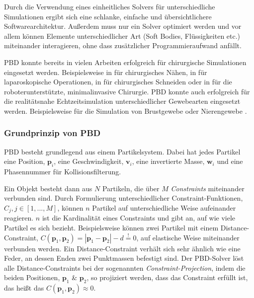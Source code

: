 Durch die Verwendung eines einheitliches Solvers für unterschiedliche Simulationen ergibt sich eine schlanke, einfache und übersichtlichere Softwarearchitektur. Außerdem muss nur ein Solver optimiert werden und vor allem können Elemente unterschiedlicher Art (Soft Bodies, Flüssigkeiten etc.) miteinander interagieren, ohne dass zusätzlicher Programmieraufwand anfällt.

PBD konnte bereits in vielen Arbeiten erfolgreich für chirurgische Simulationen eingesetzt werden. Beispielsweise in \cite{PBDThread} für chirurgisches Nähen, in \cite{VRLaparoscop} für laparoskopische Operationen, in \cite{PBDCutting} für chirurgisches Schneiden oder in \cite{VRRobSim} für die roboterunterstützte, minimalinvasive Chirurgie. 
PBD konnte auch erfolgreich für die realitätsnahe Echtzeitsimulation unterschiedlicher Gewebearten eingesetzt werden. Beispielsweise für die Simulation von Brustgewebe \cite{BreastBiopsy} oder Nierengewebe \cite{PBDKidney}.

\subsubsection{Grundprinzip von PBD}

\ac{PBD} besteht grundlegend aus einem Partikelsystem. Dabei hat jedes Partikel eine Position, $\textbf{p}_i$, eine Geschwindigkeit, $\textbf{v}_i$, eine invertierte Masse, $\textbf{w}_i$ und eine Phasennummer für Kollisionsfilterung. 

Ein Objekt besteht dann aus $N$ Partikeln, die über $M$ \textit{Constraints} miteinander verbunden sind. Durch Formulierung unterschiedlicher Constraint-Funktionen, $C_j, j \in [1,...,M] $, können $n$ Partikel auf unterschiedliche Weise aufeinander reagieren. $n$ ist die Kardinalität eines Constraints und gibt an, auf wie viele Partikel es sich bezieht.
Beispielsweise können zwei Partikel mit einem Distance-Constraint, $C(\textbf{p}_1,\textbf{p}_2) = |\textbf{p}_1-\textbf{p}_2|-d \stackrel{!}{=} 0$, auf elastische Weise miteinander verbunden werden. Ein Distance-Constraint verhält sich sehr ähnlich wie eine Feder, an dessen Enden zwei Punktmassen befestigt sind. 
Der PBD-Solver löst alle Distance-Constraints bei der sogenannten \textit{Constraint-Projection}, indem die beiden Positionen, $\textbf{p}_1$ \& $\textbf{p}_2$, so projiziert werden, dass das Constraint erfüllt ist, das heißt das $C(\textbf{p}_1,\textbf{p}_2) \approx 0$. 

